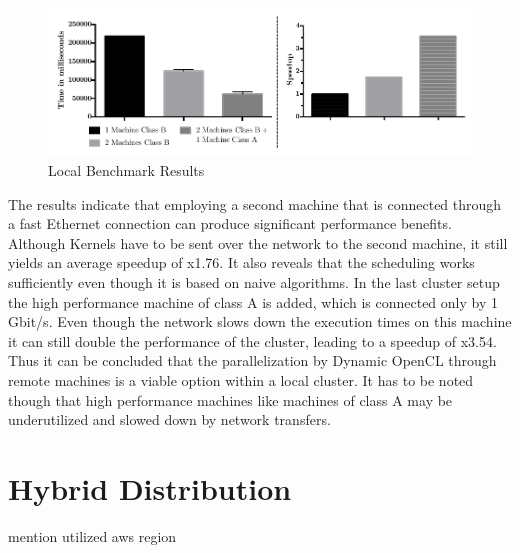 \begin{figure}[H]
	
	\includegraphics[width=1.0\textwidth]{images/local_full_benchmark_results.pdf}
	\centering
	\caption{Local Benchmark Results}
	\label{img:local_benchmark_results}
\end{figure}

The results indicate that employing a second machine that is connected through a fast Ethernet connection can produce significant performance benefits. Although Kernels have to be sent over the network to the second machine, it still yields an average speedup of x1.76. It also reveals that the scheduling works sufficiently even though it is based on naive algorithms. In the last cluster setup the high performance machine of class A is added, which is connected only by 1 Gbit/s. Even though the network slows down the execution times on this machine it can still double the performance of the cluster, leading to a speedup of x3.54. Thus it can be concluded that the parallelization by Dynamic OpenCL through remote machines is a viable option within a local cluster. It has to be noted though that high performance machines like machines of class A may be underutilized and slowed down by network transfers.

\section{Hybrid Distribution}


mention utilized aws region